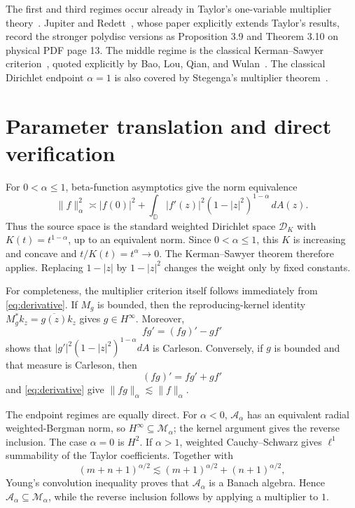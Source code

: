 \documentclass[11pt]{article}
\newcommand{\D}{\mathbb D}
\newcommand{\A}{\mathcal A}
\newcommand{\M}{\mathcal M}
\begin{document}
The first and third regimes occur already in Taylor's one-variable multiplier
theory~\cite{Taylor}. Jupiter and Redett~\cite{JR}, whose paper explicitly
extends Taylor's results, record the stronger polydisc versions as Proposition
3.9 and Theorem 3.10 on physical PDF page 13. The middle regime is the classical
Kerman--Sawyer criterion~\cite{KS}, quoted explicitly by Bao, Lou, Qian, and
Wulan~\cite[p.~1722; physical PDF p.~23]{Bao}. The classical Dirichlet endpoint
$\alpha=1$ is also covered by Stegenga's multiplier theorem~\cite{Stegenga}.

\section{Parameter translation and direct verification}

For $0<\alpha\leq1$, beta-function asymptotics give the norm equivalence
\begin{equation}\label{eq:derivative}
 \|f\|_\alpha^2\asymp |f(0)|^2+
 \int_\D |f'(z)|^2(1-|z|^2)^{1-\alpha}\,dA(z).
\end{equation}
Thus the source space is the standard weighted Dirichlet space $\mathcal D_K$
with $K(t)=t^{1-\alpha}$, up to an equivalent norm. Since
$0<\alpha\leq1$, this $K$ is increasing and concave and
$t/K(t)=t^\alpha\to0$. The Kerman--Sawyer theorem therefore applies. Replacing
$1-|z|$ by $1-|z|^2$ changes the weight only by fixed constants.

For completeness, the multiplier criterion itself follows immediately from
\eqref{eq:derivative}. If $M_g$ is bounded, then the reproducing-kernel identity
$M_g^*k_z=\overline{g(z)}k_z$ gives $g\in H^\infty$. Moreover,
\[
 fg'=(fg)'-gf'
\]
shows that $|g'|^2(1-|z|^2)^{1-\alpha}dA$ is Carleson. Conversely, if $g$ is
bounded and that measure is Carleson, then
\[
 (fg)'=f g'+g f'
\]
and \eqref{eq:derivative} give $\|fg\|_\alpha\lesssim\|f\|_\alpha$.

The endpoint regimes are equally direct. For $\alpha<0$, $\A_\alpha$ has an
equivalent radial weighted-Bergman norm, so $H^\infty\subseteq\M_\alpha$; the
kernel argument gives the reverse inclusion. The case $\alpha=0$ is $H^2$.
If $\alpha>1$, weighted Cauchy--Schwarz gives $\ell^1$ summability of the Taylor
coefficients. Together with
\[
 (m+n+1)^{\alpha/2}\lesssim
 (m+1)^{\alpha/2}+(n+1)^{\alpha/2},
\]
Young's convolution inequality proves that $\A_\alpha$ is a Banach algebra.
Hence $\A_\alpha\subseteq\M_\alpha$, while the reverse inclusion follows by
applying a multiplier to $1$.
\end{document}

